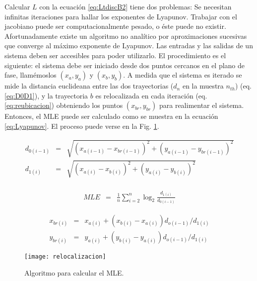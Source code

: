 Calcular $L$ con la ecuación \ref{eq:LtdiscB2} tiene dos problemas:
Se necesitan infinitas iteraciones para hallar los exponentes de Lyapunov.
Trabajar con el jacobiano puede ser computacionalmente pesado, o éste puede no existir.
Afortunadamente existe un algoritmo no analítico por aproximaciones sucesivas que converge al máximo exponente de Lyapunov.
Las entradas y las salidas de un sistema deben ser accesibles para poder utilizarlo.
El procedimiento es el siguiente: el sistema debe ser iniciado desde dos puntos cercanos en el plano de fase, llamémoslos $(x_a,y_a)$ y $(x_b,y_b)$.
A medida que el sistema es iterado se mide la distancia euclideana entre las dos trayectorias ($d_n$ en la muestra $n_{th}$) (eq. \ref{eq:D0D1}), y la trayectoria $b$ es relocalizada en cada iteración (eq. \ref{eq:reubicacion}) obteniendo los puntos $(x_{br},y_{br})$ para realimentar el sistema.
Entonces, el MLE puede ser calculado como se muestra en la ecuación \ref{eq:Lyapunov}.
El proceso puede verse en la Fig. \ref{fig:relocalizacion}.

\begin{eqnarray}\label{eq:D0D1}
d_{0(i-1)}&=& \sqrt{(x_{a(i-1)}-x_{br(i-1)})^2+(y_{a(i-1)}-y_{br(i-1)})^2}\nonumber\\
d_{1(i)}&=& \sqrt{(x_{a(i)}-x_{b(i)})^2+(y_{a(i)}-y_{b(i)})^2}\\
\nonumber
\end{eqnarray}

\begin{eqnarray}\label{eq:Lyapunov}
MLE &=& \frac{1}{n} \sum_{i=2}^{n} \log_2{\frac{d_{1(i)}}{d_{0(i-1)}}}
\end{eqnarray}

\begin{eqnarray}\label{eq:reubicacion}
x_{br(i)}&=& x_{a(i)}+(x_{b(i)}-x_{a(i)})d_{o(i-1)}/d_{1(i)} \nonumber\\
y_{br(i)}&=& y_{a(i)}+(y_{b(i)}-y_{a(i)})d_{o(i-1)}/d_{1(i)}
\end{eqnarray}

\begin{figure}
	\centering
	\texttt{[image: relocalizacion]}\\
	\caption{Algoritmo para calcular el MLE.}\label{fig:relocalizacion}
\end{figure}